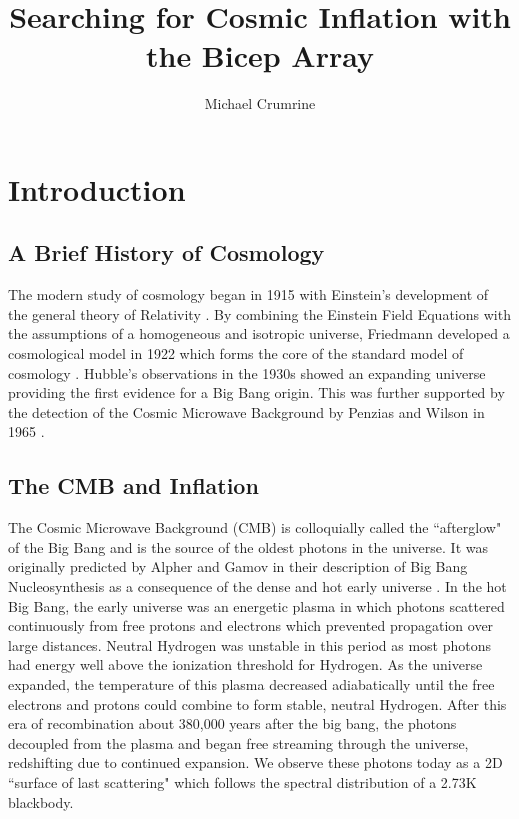 \documentclass[12pt]{article}
\begin{document}
\author{Michael Crumrine}
\title{Searching for Cosmic Inflation with the Bicep Array}
\maketitle



\section{Introduction}

\subsection{A Brief History of Cosmology}
The modern study of cosmology began in 1915 with Einstein's development of the general
theory of Relativity \cite{cite:Einstein}. By combining the Einstein Field
Equations with the assumptions of a homogeneous and isotropic universe,
Friedmann developed a cosmological model in 1922 which forms the core of the standard
model of cosmology \cite{cite:Friedmann}. Hubble's observations in the 1930s
showed an expanding universe \cite{cite:Hubble} providing the first evidence
for a Big Bang origin. This was further supported by the detection of the
Cosmic Microwave Background by Penzias and Wilson in 1965 \cite{cite:Penzias}.



\subsection{The CMB and Inflation}
The Cosmic Microwave Background (CMB) is colloquially called the ``afterglow"
of the Big Bang and is the source of the oldest photons in the universe.
It was originally predicted by Alpher and Gamov in their description of Big Bang
Nucleosynthesis as a consequence of the dense and hot early
universe \cite{cite:BBN}.  In the hot Big Bang, the early universe was an
energetic plasma in which photons scattered continuously from free protons and
electrons which prevented propagation over large distances.  Neutral Hydrogen
was unstable in this period as most photons had energy well above the
ionization threshold for Hydrogen. As the universe expanded, the temperature
of this plasma decreased adiabatically until the free electrons and protons
could combine to form stable, neutral Hydrogen. After this era of
recombination about 380,000 years after the big bang, the photons decoupled
from the plasma and began free streaming through the universe, redshifting due
to continued expansion. We observe these photons today as a 2D ``surface of last
scattering" which follows the spectral distribution of a 2.73K blackbody. 
\end{document}
